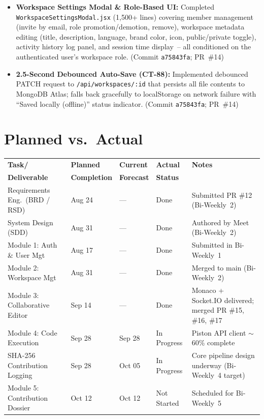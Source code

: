 \documentclass[11pt,a4paper]{article}
\begin{document}
\begin{itemize}
    \item \textbf{Workspace Settings Modal \& Role-Based UI:} Completed \texttt{WorkspaceSettingsModal.jsx} (1,500+ lines) covering member management (invite by email, role promotion/demotion, remove), workspace metadata editing (title, description, language, brand color, icon, public/private toggle), activity history log panel, and session time display~-- all conditioned on the authenticated user's workspace role. (Commit \texttt{a75843fa}; PR~\#14)

    \item \textbf{2.5-Second Debounced Auto-Save (CT-88):} Implemented debounced PATCH request to \texttt{/api/workspaces/:id} that persists all file contents to MongoDB Atlas; falls back gracefully to localStorage on network failure with ``Saved locally (offline)'' status indicator. (Commit \texttt{a75843fa}; PR~\#14)
\end{itemize}

\section{Planned vs.\ Actual}

\begin{tabular}{p{} p{} p{} p{} p{}}
\toprule
\textbf{Task/} & \textbf{Planned} & \textbf{Current} & \textbf{Actual} & \textbf{Notes} \\
\textbf{Deliverable} & \textbf{Completion} & \textbf{Forecast} & \textbf{Status} & \\
\midrule
Requirements Eng.\ (BRD / RSD) & Aug 24 & --- & Done & Submitted PR \#12 (Bi-Weekly~2) \\
System Design (SDD) & Aug 31 & --- & Done & Authored by Meet (Bi-Weekly~2) \\
Module 1: Auth \& User Mgt & Aug 17 & --- & Done & Submitted in Bi-Weekly~1 \\
Module 2: Workspace Mgt & Aug 31 & --- & Done & Merged to main (Bi-Weekly~2) \\
Module 3: Collaborative Editor & Sep 14 & --- & Done & Monaco + Socket.IO delivered; merged PR \#15, \#16, \#17 \\
Module 4: Code Execution & Sep 28 & Sep 28 & In Progress & Piston API client $\sim$60\% complete \\
SHA-256 Contribution Logging & Sep 28 & Oct 05 & In Progress & Core pipeline design underway (Bi-Weekly~4 target) \\
Module 5: Contribution Dossier & Oct 12 & Oct 12 & Not Started & Scheduled for Bi-Weekly~5 \\
\bottomrule
\end{tabular}
\end{document}
